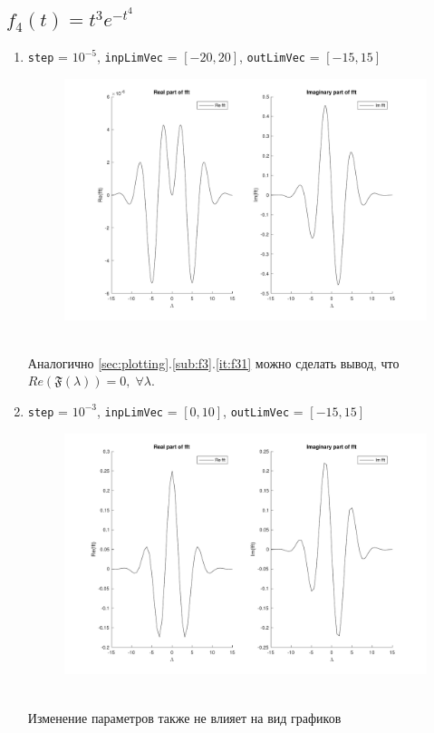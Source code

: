 \documentclass[11pt, oneside, final]{article}
\numberwithin{equation}{section}
\newcommand \four[1][\lambda]{\mathfrak{F}(#1)}
\begin{document}
    \subsection{\( f_4(t) = t^3e^{-t^4}  \)} %
    \label{sub:f4}
    \begin{enumerate}
        \item 
        \label{it:f41}
        \texttt{step} = \(10^{-5}\), \texttt{inpLimVec} = \( [-20, 20] \), \texttt{outLimVec} = \( [-15, 15] \)
        \begin{figure}[!h]
            \centering
            \includegraphics[width=\linewidth]{f4fig1}
            \label{pic:f4:1}
        \end{figure} \\
        Аналогично \ref{sec:plotting}.\ref{sub:f3}.\ref{it:f31} можно сделать вывод, что \(Re(\four) = 0, \; \forall \lambda \). \\
        \clearpage
        \item
        \label{it:f42}
        \texttt{step} = \(10^{-3}\), \texttt{inpLimVec} = \( [0, 10] \), \texttt{outLimVec} = \( [-15, 15] \)
        \begin{figure}[!h]
            \centering
            \includegraphics[width=\linewidth]{f4fig2}
            \label{pic:f4:2}
        \end{figure} \\
        Изменение параметров также не влияет на вид графиков
    \end{enumerate}
    \clearpage
    \appendix
\end{document}
